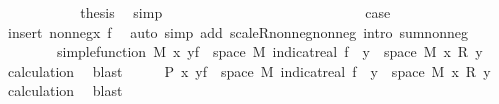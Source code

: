 \begin{isabellebody}
\ \ \ \ \ \ \ \ \isamarkupfalse%
\ \isamarkupfalse%
\ {\isacharquery}{\kern0pt}thesis\ \isamarkupfalse%
\ simp\isanewline
\ \ \ \ \ \ \isamarkupfalse%
\isanewline
\ \ \ \ \isamarkupfalse%
\isanewline
\ \ \ \ \ \ \isamarkupfalse%
\ {\isacharparenleft}{\kern0pt}{}\ {\isasymxi}{\isacharparenright}{\kern0pt}\isanewline
\ \ \ \ \ \ \isamarkupfalse%
\ {\isacharquery}{\kern0pt}case\ \isamarkupfalse%
\ insert\ nonneg{\isacharunderscore}{\kern0pt}x\ f{\isacharparenleft}{\kern0pt}{}{\isacharparenright}{\kern0pt}\ \isamarkupfalse%
\ {\isacharparenleft}{\kern0pt}auto\ simp\ add{\isacharcolon}{\kern0pt}\ scaleR{\isacharunderscore}{\kern0pt}nonneg{\isacharunderscore}{\kern0pt}nonneg\ intro{\isacharcolon}{\kern0pt}\ sum{\isacharunderscore}{\kern0pt}nonneg{\isacharparenright}{\kern0pt}\isanewline
\ \ \ \ \isacommand{{\isacharbraceright}{\kern0pt}}\isamarkupfalse%
\isanewline
\ \ \isamarkupfalse%
\isanewline
\ \ \isamarkupfalse%
\ \isamarkupfalse%
\ {\isachardoublequoteopen}simple{\isacharunderscore}{\kern0pt}function\ M\ {\isacharparenleft}{\kern0pt}{\isasymlambda}x{\isachardot}{\kern0pt}\ {\isasymSum}y{\isasymin}f\ {\isacharbackquote}{\kern0pt}\ space\ M{\isachardot}{\kern0pt}\ indicat{\isacharunderscore}{\kern0pt}real\ {\isacharparenleft}{\kern0pt}f\ {\isacharminus}{\kern0pt}{\isacharbackquote}{\kern0pt}\ {\isacharbraceleft}{\kern0pt}y{\isacharbraceright}{\kern0pt}\ {\isasyminter}\ space\ M{\isacharparenright}{\kern0pt}\ x\ {\isacharasterisk}{\kern0pt}\isactrlsub R\ y{\isacharparenright}{\kern0pt}{\isachardoublequoteclose}\ \isamarkupfalse%
\ calculation\ \isamarkupfalse%
\ blast\isanewline
\ \ \isamarkupfalse%
\ \isamarkupfalse%
\ {\isachardoublequoteopen}P\ {\isacharparenleft}{\kern0pt}{\isasymlambda}x{\isachardot}{\kern0pt}\ {\isasymSum}y{\isasymin}f\ {\isacharbackquote}{\kern0pt}\ space\ M{\isachardot}{\kern0pt}\ indicat{\isacharunderscore}{\kern0pt}real\ {\isacharparenleft}{\kern0pt}f\ {\isacharminus}{\kern0pt}{\isacharbackquote}{\kern0pt}\ {\isacharbraceleft}{\kern0pt}y{\isacharbraceright}{\kern0pt}\ {\isasyminter}\ space\ M{\isacharparenright}{\kern0pt}\ x\ {\isacharasterisk}{\kern0pt}\isactrlsub R\ y{\isacharparenright}{\kern0pt}{\isachardoublequoteclose}\ \isamarkupfalse%
\ calculation\ \isamarkupfalse%
\ blast\isanewline
\ \ \isamarkupfalse%

\end{isabellebody}
